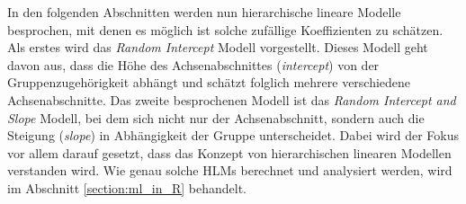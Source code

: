 \documentclass[12pt]{article}\usepackage[]{graphicx}\usepackage[]{color}
\numberwithin{equation}{section}
\begin{document}
In den folgenden Abschnitten werden nun hierarchische lineare Modelle besprochen, mit denen es möglich ist solche zufällige Koeffizienten zu schätzen. Als erstes wird das \textit{Random Intercept} Modell vorgestellt. Dieses Modell geht davon aus, dass die Höhe des Achsenabschnittes (\textit{intercept}) von der Gruppenzugehörigkeit abhängt und schätzt folglich mehrere verschiedene Achsenabschnitte. Das zweite besprochenen Modell ist das \textit{Random Intercept and Slope} Modell, bei dem sich nicht nur der Achsenabschnitt, sondern auch die Steigung (\textit{slope}) in Abhängigkeit der Gruppe unterscheidet. Dabei wird der Fokus vor allem darauf gesetzt, dass das Konzept von hierarchischen linearen Modellen verstanden wird. Wie genau solche HLMs berechnet und analysiert werden, wird im Abschnitt \ref{section:ml_in_R} behandelt. 
\end{document}
